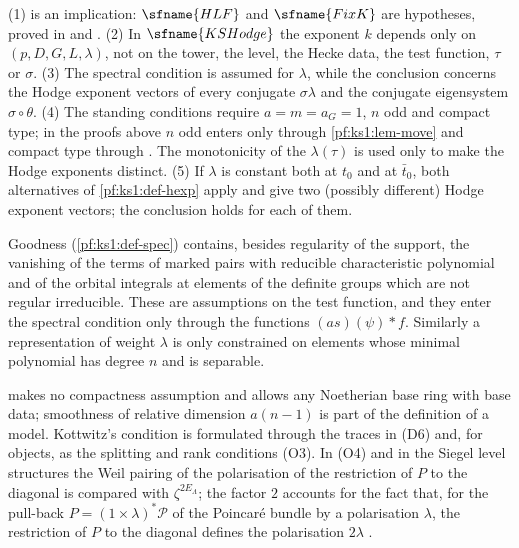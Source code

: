 \begin{remark}\label{pf:ks1:rem-kshodge}
(1)  is an implication: $\sfname{HLF}$ and $\sfname{FixK}$ are hypotheses, proved in
 and . (2) In $\sfname{KSHodge}$ the exponent $k$
depends only on $(p,D,G,L,\lambda)$, not on the tower, the level, the Hecke data, the test function, $\tau$ or $\sigma$. (3) The spectral condition is assumed
for $\lambda$, while the conclusion concerns the Hodge exponent vectors of every conjugate $\sigma\lambda$ and the conjugate eigensystem $\sigma\circ\theta$. (4) The
standing conditions require $a=m=a_G=1$, $n$ odd and compact type; in the proofs above $n$ odd enters only through
\cref{pf:ks1:lem-move} and compact type through .
The monotonicity of the $\lambda(\tau)$ is used only to make the Hodge exponents distinct. (5) If $\lambda$ is constant both at $t_0$ and at $\bar t_0$, both
alternatives of \cref{pf:ks1:def-hexp} apply and give two (possibly different) Hodge exponent vectors; the conclusion holds for each of them.
\end{remark}

\begin{remark}\label{pf:ks1:rem-good}
Goodness (\cref{pf:ks1:def-spec}) contains, besides regularity of the support, the vanishing of the terms of marked pairs with reducible characteristic
polynomial and of the orbital integrals at elements of the definite groups which are not regular irreducible. These are assumptions on the test function,
and they enter the spectral condition only through the functions $(as)(\psi)*f$. Similarly a representation of weight $\lambda$ is only constrained on
elements whose minimal polynomial has degree $n$ and is separable.
\end{remark}

\begin{remark}\label{pf:ks1:rem-models}
 makes no compactness assumption and allows any Noetherian base ring with base data; smoothness of relative dimension $a(n-1)$ is part
of the definition of a model. Kottwitz's condition is formulated through the traces in (D6) and, for objects, as the splitting and rank conditions (O3).
In (O4) and in the Siegel level structures the Weil pairing of the polarisation of the restriction of $P$ to the diagonal is compared with
$\zeta^{2E_\Lambda}$; the factor $2$ accounts for the fact that, for the pull-back $P=(1\times\lambda)^*\mathcal P$ of the Poincar\'e bundle by a
polarisation $\lambda$, the restriction of $P$ to the diagonal defines the polarisation $2\lambda$ \cite{Mumford1970}.
\end{remark}
